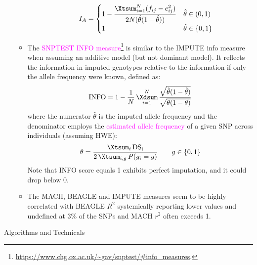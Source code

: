 \documentclass[UTF8]{book}
\DeclareMathOperator*{\Xsum}{\mathchoice{\Xdsum}{\Xtsum}{\Xtsum}{\Xtsum}}
\newcommand{\et}{&}
\newcommand{\f}{^2}
\newcommand{\concept}[1]{\textcolor{magenta}{#1}}
\begin{document}
\begin{itemize}
\begin{itemize}
\begin{itemize}
	$$
		I_A = \begin{cases}
			1 - \dfrac{\Xsum_{i=1}^N(f_{ij} - e_{ij}\f)}{2N(\hat{\theta}(1-\hat{\theta}))} \et \hat{\theta}\in(0,1) \\ 
			1 \et \hat{\theta}\in\{0,1\}
		\end{cases}	
	$$
\end{itemize}
\item The \textcolor{magenta}{SNPTEST INFO measure}\footnote{\url{https://www.chg.ox.ac.uk/\~gav/snptest/\#info\_measures}.} is similar to the IMPUTE info measure when assuming an additive model (but not dominant model). It reflects the information in imputed genotypes relative to the information if only the allele frequency were known, defined as:
$$
\mathrm{INFO} = 1 - \dfrac{1}{N}\Xsum_{i=1}^N\dfrac{\sqrt{\hat{\theta}(1-\hat{\theta})}}{\sqrt{\theta(1-\theta)}}
$$
where the numerator $\hat{\theta}$ is the imputed allele frequency and the denominator employs the \concept{estimated allele frequency} of a given SNP across individuals (assuming HWE):
$$
\theta = \dfrac{\Xsum_i \mathrm{DS_i}}{2\Xsum_{i,g}P(g_i = g)} \qquad g\in \{0,1\}
$$
Note that INFO score equals 1 exhibits perfect imputation, and it could drop below 0.
\item The MACH, BEAGLE and IMPUTE measures seem to be highly correlated with BEAGLE $R\f$ systemically reporting lower values and undefined at $3\%$ of the SNPs and MACH $r\f$ often exceeds 1. 
\end{itemize}
\end{itemize}
\newpage
\begin{center}
\Large{Algorithms and Technicals}
\end{center}
\end{document}
